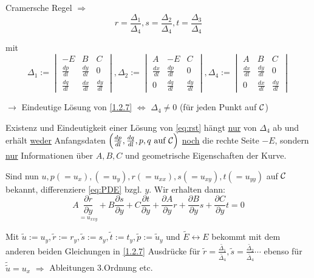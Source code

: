Cramersche Regel $\Rightarrow$
\begin{equation}
    r= \frac{\Delta_1}{\Delta_4}, s=\frac{\Delta_2}{\Delta_4}, t=\frac{\Delta_3}{\Delta_4}
    \label{}
\end{equation}

mit 
\[
    \Delta_1 :=
    \begin{vmatrix} -E & B & C \\
        \frac{dp}{dl} & \frac{dy}{dl} & 0 \\
        \frac{dq}{dl} & \frac{dx}{dl} & \frac{dy}{dl}
    \end{vmatrix}

    ,\Delta_2 :=
    \begin{vmatrix} A & -E & C \\
        \frac{dx}{dl} & \frac{dp}{dl} & 0 \\
        0 & \frac{dq}{dl} & \frac{dy}{dl}
    \end{vmatrix}

    ,\Delta_4 :=
    \begin{vmatrix} A & B & C \\
        \frac{dx}{dl} & \frac{dy}{dl} & 0 \\
        0 & \frac{dx}{dl} & \frac{dy}{dl}
    \end{vmatrix}
\]

$\to$ Eindeutige Lösung von \ref{1.2.7} $\Leftrightarrow$ $\Delta_4 \neq 0$ (für jeden Punkt auf $\mathcal{C}$)

\begin{bemerkung} %
    Existenz und Eindeutigkeit einer Lösung von \eqref{eq:rst} hängt \underline{nur} von $\Delta_4$ ab und erhält \underline{weder} Anfangsdaten $\left( \frac{dp}{dl}, \frac{dq}{dl}, p, q \text{ auf } \mathcal{C} \right)$ \underline{noch} die rechte Seite $-E$, sondern \underline{nur} Informationen über $A,B,C$ und geometrische Eigenschaften der Kurve.\\
\end{bemerkung}

Sind nun $u, p(=u_x), (=u_y), r(=u_{xx}), s(=u_{xy}), t(=u_{yy})$ auf $\mathcal{C}$ bekannt, differenziere \eqref{eq:PDE} bzgl. $y$. Wir erhalten dann:
\[
    A \underset{=u_{xxy}}{\frac{\partial r}{\partial y}} + B \frac{\partial s}{\partial y} + C \frac{\partial t}{\partial y} + \frac{\partial A}{\partial y} r + \frac{\partial B}{\partial y} s + \frac{\partial C}{\partial y} t = 0
\]

Mit $\tilde{u} := u_y, \tilde{r} := r_y, \tilde{s}:=s_y, \tilde{t}:=t_y, \tilde{p}:=\tilde{u}_y$ und $\tilde{E} \leftrightarrow E$ bekommt mit dem anderen beiden Gleichungen in \ref{1.2.7} Ausdrücke für $\tilde{r}=\frac{\tilde{\Delta_1}}{\tilde{\Delta_4}}, \tilde{s} = \frac{\tilde{\Delta_2}}{\tilde{\Delta_4}}\cdots$ ebenso für $\tilde{\tilde{u}} = u_x$ $\Rightarrow$ Ableitungen 3.Ordnung etc.

